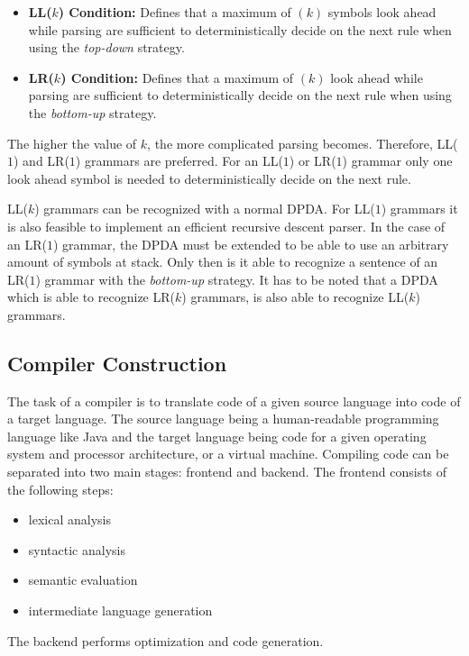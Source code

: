 \begin{itemize}
    \item \textbf{LL($k$) Condition:} Defines that a maximum of $(k)$ symbols look ahead while parsing are sufficient to deterministically decide on the next rule when using the \textit{top-down} strategy.
    \item \textbf{LR($k$) Condition:} Defines that a maximum of $(k)$ look ahead while parsing are sufficient to deterministically decide on the next rule when using the \textit{bottom-up} strategy.
\end{itemize}

The higher the value of $k$, the more complicated parsing becomes. Therefore, LL($1$) and LR($1$) grammars are preferred. For an LL($1$) or LR($1$) grammar only one look ahead symbol is needed to deterministically decide on the next rule. 

LL($k$) grammars can be recognized with a normal DPDA. For LL($1$) grammars it is also feasible to implement an efficient recursive descent parser. In the case of an LR($1$) grammar, the DPDA must be extended to be able to use an arbitrary amount of symbols at stack. Only then is it able to recognize a sentence of an LR($1$) grammar with the \textit{bottom-up} strategy. It has to be noted that a DPDA which is able to recognize LR($k$) grammars, is also able to recognize LL($k$) grammars.

\subsection{Compiler Construction}

The task of a compiler is to translate code of a given source language into code of a target language. The source language being a human-readable programming language like Java and the target language being code for a given operating system and processor architecture, or a virtual machine. Compiling code can be separated into two main stages: frontend and backend.
The frontend consists of the following steps:
\begin{itemize}
    \item lexical analysis
    \item syntactic analysis
    \item semantic evaluation
    \item intermediate language generation
\end{itemize}

The backend performs optimization and code generation.

